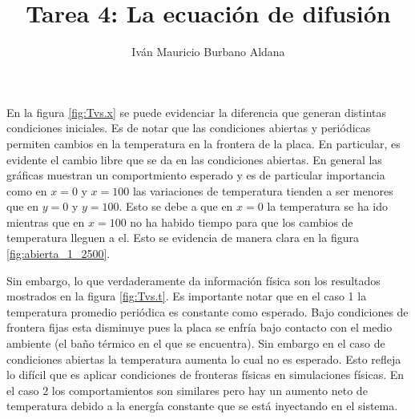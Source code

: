 \documentclass[a4paper]{article}
\title{Tarea 4: La ecuaci\'on de difusi\'on}
\author{Iv\'an Mauricio Burbano Aldana}
\begin{document}
	\maketitle

	En la figura \ref{fig:Tvs.x} se puede evidenciar la diferencia que generan distintas condiciones iniciales. Es de notar que las condiciones abiertas y peri\'odicas permiten cambios en la temperatura en la frontera de la placa. En particular, es evidente el cambio libre que se da en las condiciones abiertas. En general las gr\'aficas muestran un comportmiento esperado y es de particular importancia como en $x=0$ y $x=100$ las variaciones de temperatura tienden a ser menores que en $y=0$ y $y=100$. Esto se debe a que en $x=0$ la temperatura se ha ido mientras que en $x=100$ no ha habido tiempo para que los cambios de temperatura lleguen a el. Esto se evidencia de manera clara en la figura \ref{fig:abierta_1_2500}. 

	Sin embargo, lo que verdaderamente da informaci\'on f\'isica son los resultados mostrados en la figura \ref{fig:Tvs.t}. Es importante notar que en el caso 1 la temperatura promedio peri\'odica es constante como esperado. Bajo condiciones de frontera fijas esta disminuye pues la placa se enfr\'ia bajo contacto con el medio ambiente (el ba\~no t\'ermico en el que se encuentra). Sin embargo en el caso de condiciones abiertas la temperatura aumenta lo cual no es esperado. Esto refleja lo dif\'icil que es aplicar condiciones de fronteras f\'isicas en simulaciones f\'isicas. En el caso 2 los comportamientos son similares pero hay un aumento neto de temperatura debido a la energ\'ia constante que se est\'a inyectando en el sistema.
\end{document}
